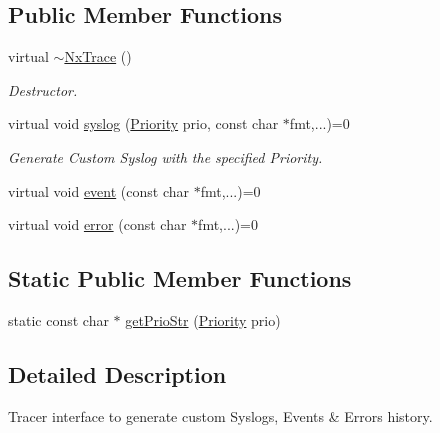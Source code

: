 \subsection*{Public Member Functions}
\begin{DoxyCompactItemize}
\item 
\mbox{\label{classnxos_1_1_nx_trace_a4b8ef9990a168effbca47f29d9b6ea9d}} 
virtual \mbox{\hyperlink{classnxos_1_1_nx_trace_a4b8ef9990a168effbca47f29d9b6ea9d}{$\sim$\+Nx\+Trace}} ()
\begin{DoxyCompactList}\small\item\em Destructor. \end{DoxyCompactList}\item 
\mbox{\label{classnxos_1_1_nx_trace_a825db76787da234b99e81adb2def8d3d}} 
virtual void \mbox{\hyperlink{classnxos_1_1_nx_trace_a825db76787da234b99e81adb2def8d3d}{syslog}} (\mbox{\hyperlink{classnxos_1_1_nx_trace_a582f6e5a22e788c61807657f8bca088f}{Priority}} prio, const char $\ast$fmt,...)=0
\begin{DoxyCompactList}\small\item\em Generate Custom Syslog with the specified Priority. \end{DoxyCompactList}\item 
virtual void \mbox{\hyperlink{classnxos_1_1_nx_trace_a22e5e2fff39fae68fba3051dc2720621}{event}} (const char $\ast$fmt,...)=0
\item 
virtual void \mbox{\hyperlink{classnxos_1_1_nx_trace_afc0240b6b9a291729836ffb2fbeef8a4}{error}} (const char $\ast$fmt,...)=0
\end{DoxyCompactItemize}
\subsection*{Static Public Member Functions}
\begin{DoxyCompactItemize}
\item 
static const char $\ast$ \mbox{\hyperlink{classnxos_1_1_nx_trace_a583b8a49a2111e4e4b8ef2f2eeaa4620}{get\+Prio\+Str}} (\mbox{\hyperlink{classnxos_1_1_nx_trace_a582f6e5a22e788c61807657f8bca088f}{Priority}} prio)
\end{DoxyCompactItemize}


\subsection{Detailed Description}
Tracer interface to generate custom Syslogs, Events \& Errors history. 

